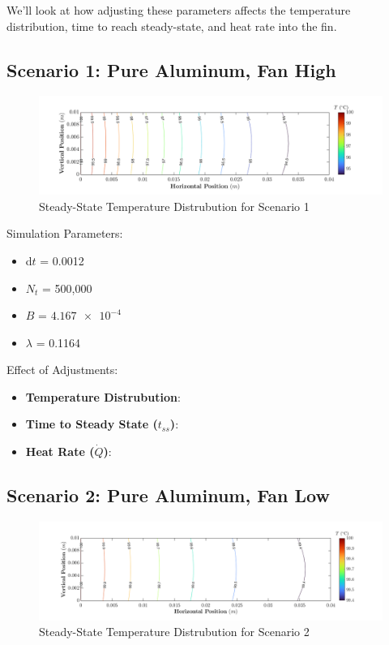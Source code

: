 \documentclass{article}
\begin{document}
We'll look at how adjusting these parameters affects the temperature distribution, time to reach steady-state, and heat rate into the fin.

\pagebreak

\subsection{Scenario 1: Pure Aluminum, Fan High}

\begin{figure}[h]
    \centering
    \includegraphics[width=1\textwidth]{fig/contour1.png}
    \caption{Steady-State Temperature Distrubution for Scenario 1}
    \label{fig: Plot1}
\end{figure}

Simulation Parameters:
\begin{itemize}
    \item d$t$ = 0.0012
    \item $N_t$ = 500,000
    \item $B$ = $\SI{4.167e-4}{}$
    \item $\lambda$ = 0.1164
\end{itemize}

Effect of Adjustments:
\begin{itemize}
    \item \textbf{Temperature Distrubution}:
    \item \textbf{Time to Steady State ($t_{ss}$)}:
    \item \textbf{Heat Rate ($\dot{Q}$)}:
\end{itemize}

\pagebreak

\subsection{Scenario 2: Pure Aluminum, Fan Low}

\begin{figure}[h]
    \centering
    \includegraphics[width=1\textwidth]{fig/contour2.png}
    \caption{Steady-State Temperature Distrubution for Scenario 2}
    \label{fig: Plot2}
\end{figure}
\end{document}
